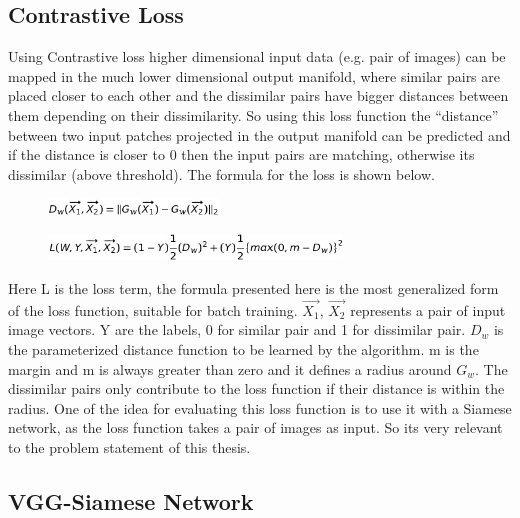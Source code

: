 \newpage
\subsection{Contrastive Loss}
Using Contrastive loss higher dimensional input data (e.g. pair of images) can be mapped in the much lower dimensional output manifold, where similar pairs are placed closer to each other and 
the dissimilar pairs have bigger distances between them depending on their dissimilarity.  So using this loss function the “distance” between two input patches projected in the output manifold can be 
predicted and if the distance is closer to 0 then the input pairs are matching, otherwise its dissimilar (above threshold). The formula for the loss is shown below. 
\begin{figure}[ht]
\centering
\includegraphics[height= 0.45cm]{images/contrastive/contrastive_loss_formula1.jpg}%
\label{fig:contrastive_loss_formula1}
\end{figure}

\begin{figure}[ht]
\centering
\includegraphics[height= 0.7cm]{images/contrastive/contrastive_loss_formula2.jpg}
\label{fig:contrastive_loss_formula2}
\end{figure}

Here L is the loss term, the formula presented here is the most generalized form of the loss function, suitable for batch training. 
$ \vec{X_1}$, $ \vec{X_2}$ represents a pair of input image vectors. Y are the labels, 0 for similar pair and 1 for dissimilar pair. $D_w$ is the parameterized distance function to be learned by the algorithm. 
m is the margin and m is always greater than zero and it defines a radius around $G_w$. The dissimilar pairs only contribute to the loss function if their distance is within the radius.
One of the idea for evaluating this loss function is to use it with a Siamese network, as the loss function takes a pair of images as input. So its very relevant to the problem statement of this thesis. 


\subsection{VGG-Siamese Network}


